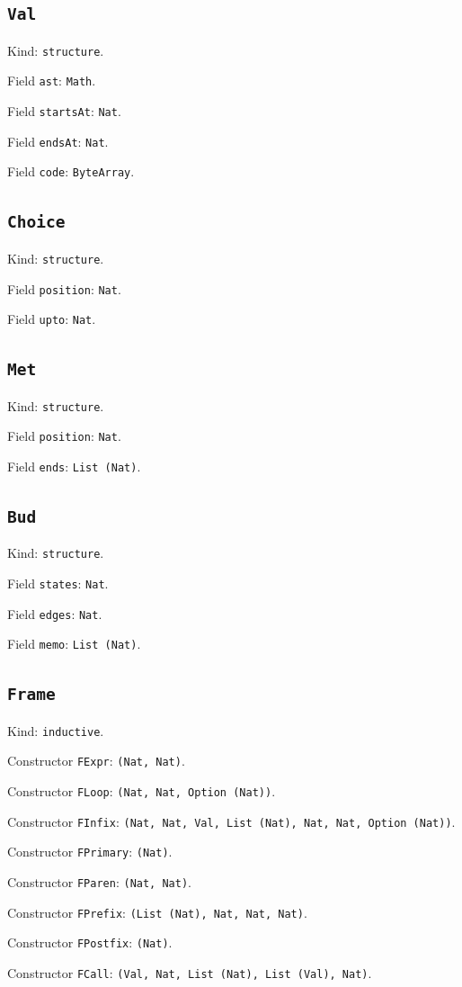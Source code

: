 \documentclass[11pt]{article}
\begin{document}
\subsection*{\texttt{Val}}
\noindent Kind: \texttt{structure}.\par
\noindent Field \texttt{ast}: \texttt{Math}.\par
\noindent Field \texttt{startsAt}: \texttt{Nat}.\par
\noindent Field \texttt{endsAt}: \texttt{Nat}.\par
\noindent Field \texttt{code}: \texttt{ByteArray}.\par
\subsection*{\texttt{Choice}}
\noindent Kind: \texttt{structure}.\par
\noindent Field \texttt{position}: \texttt{Nat}.\par
\noindent Field \texttt{upto}: \texttt{Nat}.\par
\subsection*{\texttt{Met}}
\noindent Kind: \texttt{structure}.\par
\noindent Field \texttt{position}: \texttt{Nat}.\par
\noindent Field \texttt{ends}: \texttt{List (Nat)}.\par
\subsection*{\texttt{Bud}}
\noindent Kind: \texttt{structure}.\par
\noindent Field \texttt{states}: \texttt{Nat}.\par
\noindent Field \texttt{edges}: \texttt{Nat}.\par
\noindent Field \texttt{memo}: \texttt{List (Nat)}.\par
\subsection*{\texttt{Frame}}
\noindent Kind: \texttt{inductive}.\par
\noindent Constructor \texttt{FExpr}: \texttt{(Nat, Nat)}.\par
\noindent Constructor \texttt{FLoop}: \texttt{(Nat, Nat, Option (Nat))}.\par
\noindent Constructor \texttt{FInfix}: \texttt{(Nat, Nat, Val, List (Nat), Nat, Nat, Option (Nat))}.\par
\noindent Constructor \texttt{FPrimary}: \texttt{(Nat)}.\par
\noindent Constructor \texttt{FParen}: \texttt{(Nat, Nat)}.\par
\noindent Constructor \texttt{FPrefix}: \texttt{(List (Nat), Nat, Nat, Nat)}.\par
\noindent Constructor \texttt{FPostfix}: \texttt{(Nat)}.\par
\noindent Constructor \texttt{FCall}: \texttt{(Val, Nat, List (Nat), List (Val), Nat)}.\par
\end{document}

